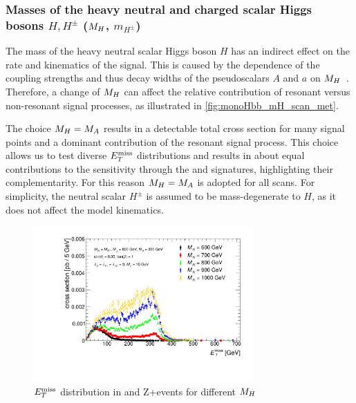 \subsubsection{Masses of the heavy neutral and charged scalar Higgs bosons $H, H^{\pm}$ ($M_{H}$, $m_{H^{\pm}}$)}

The mass of the heavy neutral scalar Higgs boson $H$ has an indirect effect on the rate and kinematics of the signal. 
This is caused by the dependence of the coupling strengths and thus decay widths of  the pseudoscalars $A$ and $a$ on  $M_{H}$~\cite{Bauer:2017ota}. 
Therefore, a change of $M_{H}$ can affect the relative contribution of resonant versus non-resonant signal processes, as illustrated in \autoref{fig:monoHbb_mH_scan_met}.

The choice $M_{H} = M_{A}$ results in a detectable total cross section for many signal points and a dominant contribution of the resonant signal process. 
This choice allows us to test diverse $E_T^\mathrm{miss}$ distributions and results in about equal contributions to the sensitivity through the \monoz and \monoh signatures, highlighting their complementarity. For this reason $M_{H} = M_{A}$ is adopted for all scans. For simplicity, the neutral scalar $H^{\pm}$ is assumed to be mass-degenerate to $H$, as it does not affect the \hdma model kinematics.


\begin{figure}[!htbp]
	\centering

	\includegraphics[width=0.75\textwidth]{texinputs/04_grid/figures/monoHbb_mH_scan_MET_liny.pdf}
	\caption{The \MET distribution, accounting for the production cross section, of \monohbb signal events for five representative choices of $\mH = \mHc$.
	\label{fig:monoHbb_mH_scan_met}} 
     
	\caption{$E_T^\mathrm{miss}$ distribution in \monohbb and Z+\MET events for different $M_{H}$}
\end{figure}

